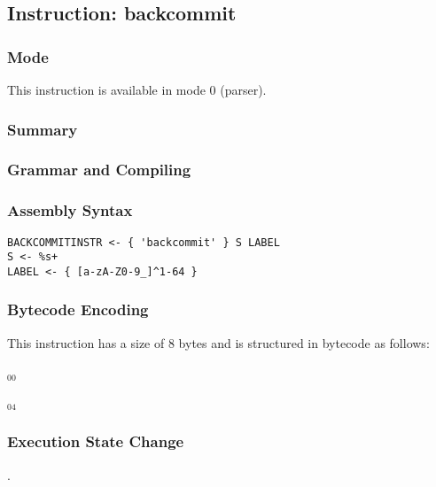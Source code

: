 \subsection{Instruction: backcommit}

\subsubsection{Mode}
This instruction is available in mode 0 (parser).
\subsubsection{Summary}


\subsubsection{Grammar and Compiling}


\subsubsection{Assembly Syntax}

\begin{myquote}
\begin{verbatim}
BACKCOMMITINSTR <- { 'backcommit' } S LABEL
S <- %s+
LABEL <- { [a-zA-Z0-9_]^1-64 }
\end{verbatim}
\end{myquote}

\subsubsection{Bytecode Encoding}

This instruction has a size of 8 bytes and is structured in bytecode as follows:

$_{00}$\ 



$_{04}$\ 

\subsubsection{Execution State Change}

.


